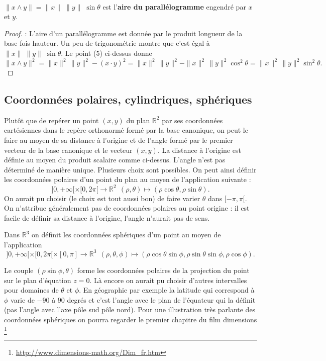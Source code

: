 \documentclass[class=report,crop=false]{standalone}
\begin{document}
\\
$\|x \land y\| = \|x\|\; \|y\|\; \sin \theta$ est l'{\bf aire du parallélogramme} engendré par $x$ et $y$.

\begin{proof} : L'aire d'un parallélogramme est donnée par le produit longueur de la base fois hauteur. Un peu de trigonométrie montre que c'est égal \`a $\|x\|\; \|y\|\; \sin \theta$. Le point (5) ci-dessus donne 
$$
\|x \land y\|^2 = \|x\|^2\, \|y\|^2 - (x \cdot y)^2=\|x\|^2\, \|y\|^2 - \|x\|^2\, \|y\|^2\cos^2\theta=\|x\|^2\, \|y\|^2\sin^2\theta.
$$
\end{proof}
\subsection{Coordonnées polaires, cylindriques, sphériques}
Plut\^ot que de repérer un point $(x,y)$ du plan $\mathbb{R}^2$ par ses coordonnées cartésiennes dans le rep\`ere orthonormé formé par la base canonique, on peut le faire au moyen de sa distance \`a l'origine et de l'angle formé par le premier vecteur de la base canonique et le vecteur $(x,y)$. La distance \`a l'origine est définie au moyen du produit scalaire comme ci-dessus. L'angle n'est pas déterminé de mani\`ere unique. Plusieurs choix sont possibles. On peut ainsi définir les coordonnées polaires d'un point du plan au moyen de l'application suivante :
$$
]0,+\infty[\times[0,2\pi[\rightarrow \mathbb{R}^2\ \ (\rho,\theta)\mapsto (\rho\cos\theta,\rho\sin\theta).
$$
On aurait pu choisir (le choix est tout aussi bon) de faire varier $\theta$ dans $[-\pi,\pi[$. On n'attribue généralement pas de coordonnées polaires au point origine : il est facile de définir sa distance \`a l'origine, l'angle n'aurait pas de sens. 

Dans $\mathbb{R}^3$ on définit les coordonnées sphériques d'un point au moyen de l'application
$$
]0,+\infty[\times[0,2\pi[\times[0,\pi]\rightarrow \mathbb{R}^3\ \ (\rho,\theta,\phi)\mapsto (\rho\cos\theta\sin\phi,\rho\sin\theta\sin\phi,\rho\cos\phi).
$$
\begin{center}
\end{center}
Le couple $(\rho \sin \phi,\theta )$ forme les coordonnées polaires de la projection du point sur le plan d'équation $z=0$. L\`a encore on aurait pu choisir d'autres intervalles pour domaines de $\theta$ et $\phi$. En géographie par exemple la latitude qui correspond \`a $\phi$ varie de $-90$ \`a $90$ degrés et c'est l'angle avec le plan de l'équateur qui la définit (pas l'angle avec l'axe p\^ole sud p\^ole nord).
Pour une illustration tr\`es parlante des coordonnées sphériques on pourra regarder le premier chapitre du film dimensions \footnote{\url{http://www.dimensions-math.org/Dim_fr.htm}}
\end{document}

